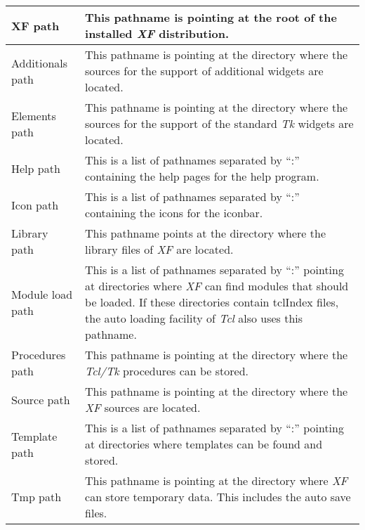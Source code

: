 {\newpage
\clearpage
\samepage \begin{supertabular}{|l|p{7.8cm}|}
XF path           & This pathname is pointing at the root of
                    the installed {\em XF }
 distribution.\\  \hline
Additionals path  & This pathname is pointing at the
                    directory where the sources for the
                    support of additional widgets are
                    located.\\  \hline
Elements path     & This pathname is pointing at the
                    directory where the sources for the
                    support of the standard {\em Tk }
 widgets are
                    located.\\  \hline
Help path         & This is a list of pathnames separated by
                    ``:'' containing the help pages for
                    the help program.\\  \hline
Icon path         & This is a list of pathnames separated by
                    ``:'' containing the icons for the
                    iconbar.\\  \hline
Library path      & This pathname points at the directory
                    where the library files of {\em XF }
 are
                    located.\\  \hline
Module load path  & This is a list of pathnames separated by
                    ``:'' pointing at directories where
                    {\em XF }
 can find modules that should be
                    loaded. If these directories contain
                    tclIndex files, the auto loading
                    facility of {\em Tcl }
 also uses this
                    pathname.\\  \hline
Procedures path   & This pathname is pointing at the
                    directory where the {\em Tcl/Tk }
 procedures
                    can be stored.\\  \hline
Source path       & This pathname is pointing at the
                    directory where the {\em XF }
 sources are
                    located.\\  \hline
Template path     & This is a list of pathnames separated by
                    ``:'' pointing at directories where
                    templates can be found and stored.\\  \hline
Tmp path          & This pathname is pointing at the
                    directory where {\em XF }
 can store temporary
                    data. This includes the auto save
                    files.\\  \hline

\end{supertabular}}
